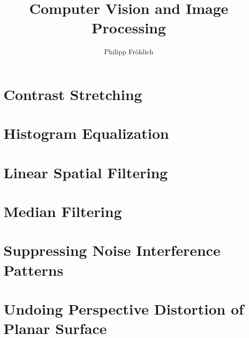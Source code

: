 \documentclass[12pt,a4paper]{scrartcl}
\author{Philipp Fröhlich}
\title{Computer Vision and Image Processing}
\begin{document}
\maketitle
\tableofcontents

\section{Contrast Stretching}


\section{Histogram Equalization}


\section{Linear Spatial Filtering}


\section{Median Filtering}


\section{Suppressing Noise Interference Patterns}


\section{Undoing Perspective Distortion of Planar Surface}
\end{document}
